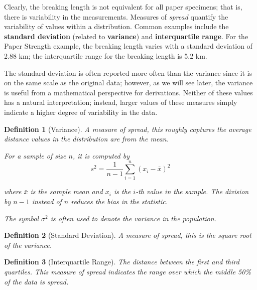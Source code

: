 \documentclass[
]{book}
\theoremstyle{plain}
\theoremstyle{mydefn}
\newtheorem{definition}{Definition}[chapter]
\theoremstyle{myexmpl}
\theoremstyle{remark}
\begin{document}
Clearly, the breaking length is not equivalent for all paper specimens; that is, there is variability in the measurements. Measures of \emph{spread} quantify the variability of values within a distribution. Common examples include the \textbf{standard deviation} (related to \textbf{variance}) and \textbf{interquartile range}. For the Paper Strength example, the breaking length varies with a standard deviation of 2.88 km; the interquartile range for the breaking length is 5.2 km.

The standard deviation is often reported more often than the variance since it is on the same scale as the original data; however, as we will see later, the variance is useful from a mathematical perspective for derivations. Neither of these values has a natural interpretation; instead, larger values of these measures simply indicate a higher degree of variability in the data.

\begin{definition}[Variance]
\protect\hypertarget{def:defn-variance}{}{\label{def:defn-variance} {} }A measure of spread, this roughly captures the average distance values in the distribution are from the mean.

For a sample of size \(n\), it is computed by
\[s^2 = \frac{1}{n-1}\sum_{i=1}^{n} \left(x_i - \bar{x}\right)^2\]

where \(\bar{x}\) is the sample mean and \(x_i\) is the \(i\)-th value in the sample. The division by \(n-1\) instead of \(n\) reduces the bias in the statistic.

The symbol \(\sigma^2\) is often used to denote the variance in the population.
\end{definition}

\begin{definition}[Standard Deviation]
\protect\hypertarget{def:defn-standard-deviation}{}{\label{def:defn-standard-deviation} {} }A measure of spread, this is the square root of the variance.
\end{definition}

\begin{definition}[Interquartile Range]
\protect\hypertarget{def:defn-interquartile-range}{}{\label{def:defn-interquartile-range} {} }The distance between the first and third quartiles. This measure of spread indicates the range over which the middle 50\% of the data is spread.
\end{definition}
\end{document}
